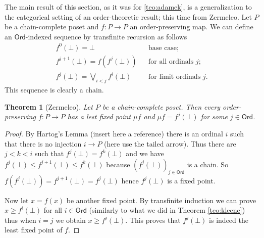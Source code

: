 \documentclass[letterpaper, 11pt, oneside]{memoir}
\theoremstyle{myteo}
\newtheorem{theorem}{Theorem}[section]
\numberwithin{equation}{section}
\newcommand{\Ord}{\textsf{Ord}}
\begin{document}
The main result of this section, as it was for \ref{teo:adamek}, is a generalization to the categorical setting of an order-theoretic result; this time from Zermeleo.
Let \(P\) be a chain-complete poset and \(f : P \to P\) an order-preserving map.
We can define an \(\Ord\)-indexed sequence by transfinite recursion as follows
\begin{align*}
  f^0(\bot) = \bot && \text{base case;}\\
  f^{j+1}(\bot) = f(f^j(\bot)) && \text{for all ordinals \(j\);} \\
  f^j(\bot) = \bigvee_{i < j}f^i(\bot) && \text{for limit ordinals \(j\).}
\end{align*}
This sequence is clearly a chain.

\begin{theorem}[Zermeleo]
  \label{teo:zermeleo}
  Let \(P\) be a chain-complete poset.
  Then every order-preserving \(f : P \to P\) has a lest fixed point \(\mu f\) and \(\mu f = f^j(\bot)\) for some \(j \in \Ord\).
\end{theorem}

\begin{proof}
  By Hartog's Lemma (insert here a reference) there is an ordinal \(i\) such that there is no injection \(i \to P\) (here use the tailed arrow).
  Thus there are \(j < k < i\) such that \(f^j(\bot) = f^k(\bot)\) and we have \(f^j(\bot) \leq f^{j+1}(\bot) \leq f^k(\bot)\) because \((f^j(\bot))_{j\in\Ord}\) is a chain.
  So \(f(f^j(\bot)) = f^{j+1}(\bot) = f^j(\bot)\) hence \(f^j(\bot)\) is a fixed point.

  Now let \(x = f(x)\) be another fixed point.
  By transfinite induction we can prove \(x \geq f^i(\bot)\) for all \(i \in \Ord\) (similarly to what we did in Theorem \ref{teo:kleene}) thus when \(i = j\) we obtain \(x \geq f^j(\bot)\).
  This proves that \(f^j(\bot)\) is indeed the least fixed point of \(f\).
\end{proof}
\end{document}
